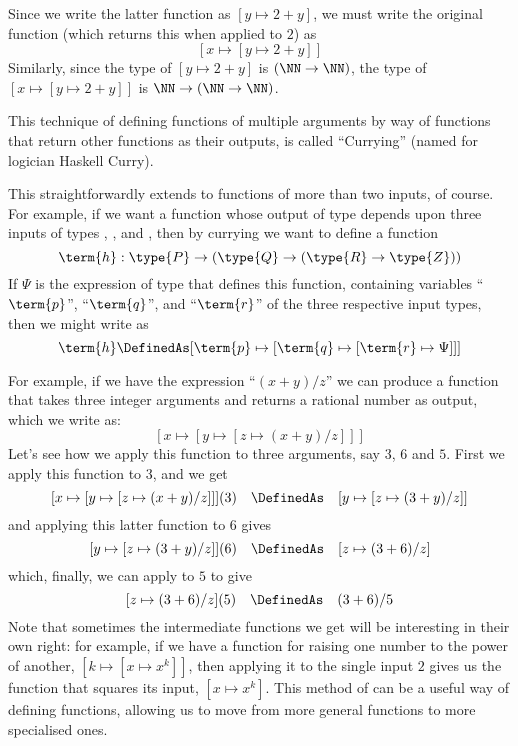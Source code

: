 Since we write the latter function as $[y \mapsto 2 + y]$, we must write the original function (which returns this when applied to $2$) as
\[
[x \mapsto [y \mapsto 2 + y]]
\]
Similarly, since the type of $[y \mapsto 2 + y]$ is $(\NN \to \NN)$, the type of $[x \mapsto [y \mapsto 2 + y]]$
is $\NN \to (\NN \to \NN)$.


This technique of defining functions of multiple arguments by way of functions that return other functions as their outputs, is called ``Currying'' (named for logician Haskell Curry). 


This straightforwardly extends to functions of more than two inputs, of course.  For example, if we want a function whose output of type  depends upon three inputs of types , , and , then by currying we want to define a function 
\[
\term{h}: \type{P} \to (\type{Q} \to (\type{R} \to \type{Z}))
\]
If $\Psi$ is the expression of type  that defines this function, containing variables ``$\term{p}$'', ``$\term{q}$'', and ``$\term{r}$'' of the three respective input types, then we might write  as 
\[
\term{h} \DefinedAs 
[\term{p} \mapsto [\term{q} \mapsto [\term{r} \mapsto \Psi]]]
\]




For example, if we have the expression ``$(x + y)/z$'' 
we can produce a function that takes three integer arguments and returns a rational number as output, which we write as:
\[
[x \mapsto [y \mapsto [z \mapsto (x + y)/z]]]
\]
Let's see how we apply this function to three arguments, say $3$, $6$ and $5$.
First we apply this function to $3$, and we get
\[
[x \mapsto [y \mapsto [z \mapsto (x + y)/z]]](3)
\quad \DefinedAs \quad 
[y \mapsto [z \mapsto (3 + y)/z]]
\]
and applying this latter function to $6$ gives
\[
[y \mapsto [z \mapsto (3 + y)/z]](6)
\quad \DefinedAs \quad 
[z \mapsto (3 + 6)/z]
\]
which, finally, we can apply to $5$ to give
\[
[z \mapsto (3 + 6)/z](5)
\quad \DefinedAs \quad 
(3 + 6)/5
\]
Note that sometimes the intermediate functions we get will be interesting in their own right: for example, if we have a function for raising one number to the power of another, 
$[k \mapsto [x \mapsto x^k]]$, 
then applying it to the single input $2$ gives us the function that squares its input, $[x \mapsto x^k]$.  This method of  can be a useful way of defining functions, allowing us to move from more general functions to more specialised ones.


